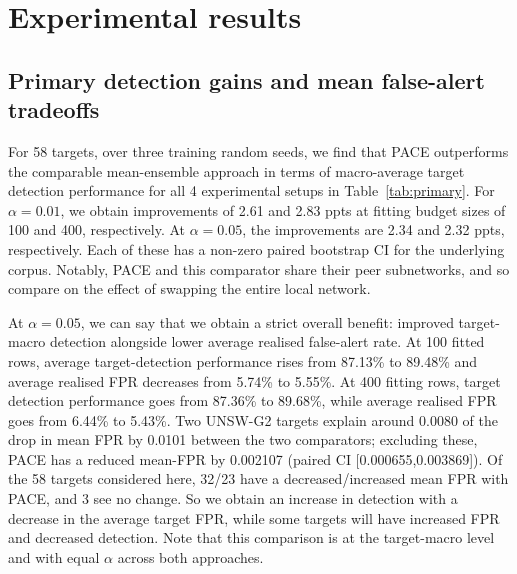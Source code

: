 \section{Experimental results} 
\label{sec:results} 
\subsection{Primary detection gains and mean false-alert tradeoffs} 
For 58 targets, over three training random seeds, we find that PACE outperforms the comparable mean-ensemble approach in terms of macro-average target detection performance for all 4 experimental setups in Table~\ref{tab:primary}. For $\alpha = 0.01$, we obtain improvements of 2.61 and 2.83 ppts at fitting budget sizes of 100 and 400, respectively. At $\alpha = 0.05$, the improvements are 2.34 and 2.32 ppts, respectively. Each of these has a non-zero paired bootstrap CI for the underlying corpus. Notably, PACE and this comparator share their peer subnetworks, and so compare on the effect of swapping the entire local network.

At $\alpha = 0.05$, we can say that we obtain a strict overall benefit: improved target-macro detection alongside lower average realised false-alert rate. At 100 fitted rows, average target-detection performance rises from 87.13\% to 89.48\% and average realised FPR decreases from 5.74\% to 5.55\%. At 400 fitting rows, target detection performance goes from 87.36\% to 89.68\%, while average realised FPR goes from 6.44\% to 5.43\%. Two UNSW-G2 targets explain around 0.0080 of the drop in mean FPR by 0.0101 between the two comparators; excluding these, PACE has a reduced mean-FPR by 0.002107 (paired CI [0.000655,0.003869]). Of the 58 targets considered here, 32/23 have a decreased/increased mean FPR with PACE, and 3 see no change. So we obtain an increase in detection with a decrease in the average target FPR, while some targets will have increased FPR and decreased detection. Note that this comparison is at the target-macro level and with equal $\alpha$ across both approaches.

\begin{table}[!htbp] 
\centering\small 
\caption{Compared against mean-ensemble at similar target realisations of false-positive rate (same $\alpha$). Target detection reported per attack type and target and averaged across all attack types, random seeds and targets. Average realised FPR is taken across random seeds and targets. CIs are at 95\% by the corpus stratified-pair bootstrap, conditional on corpus sizes and targets after averaging over seeds. Peer and new-target corpora are not bootstrapped. Reported values are \%, with difference/gain/CIs reported as percentage point differences. Differences calculated pre-rounding.} 
\label{tab:primary} 
{\setlength{\tabcolsep}{4.8pt}} 
\end{table} 

